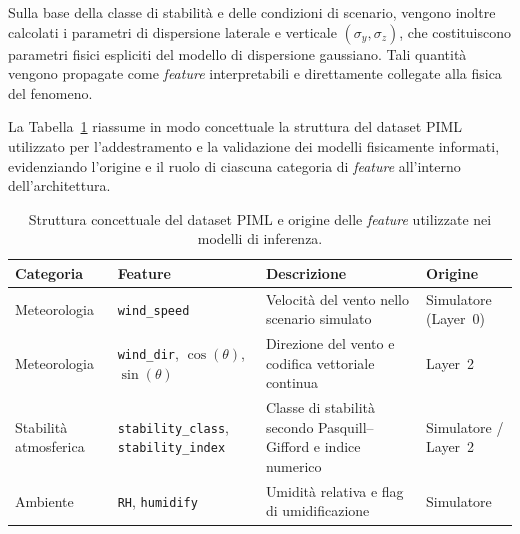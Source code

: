 Sulla base della classe di stabilità e delle condizioni di scenario, vengono inoltre calcolati i parametri di dispersione laterale e verticale $(\sigma_y, \sigma_z)$, che costituiscono parametri fisici espliciti del modello di dispersione gaussiano.
Tali quantità vengono propagate come \textit{feature} interpretabili e direttamente collegate alla fisica del fenomeno.

La Tabella~\ref{tab:piml_dataset_features} riassume in modo concettuale la struttura del dataset PIML utilizzato per l’addestramento e la validazione dei modelli fisicamente informati, evidenziando l’origine e il ruolo di ciascuna categoria di \textit{feature} all’interno dell’architettura.

\begin{table}[H]
	\centering
	\footnotesize
	\setlength{\tabcolsep}{5pt}
	\caption{Struttura concettuale del dataset PIML e origine delle \textit{feature} utilizzate nei modelli di inferenza.}
	\label{tab:piml_dataset_features}
	\begin{tabular}{p{2.4cm} p{3.2cm} p{5.2cm} p{2.4cm}}
		\toprule
		\textbf{Categoria}                                              & \textbf{Feature} & \textbf{Descrizione} & \textbf{Origine} \\
		\midrule
		Meteorologia                                                    &
		\texttt{wind\_speed}                                            &
		Velocità del vento nello scenario simulato                      &
		Simulatore (Layer~0)                                                                                                         \\

		Meteorologia                                                    &
		\texttt{wind\_dir}, $\cos(\theta)$, $\sin(\theta)$              &
		Direzione del vento e codifica vettoriale continua              &
		Layer~2                                                                                                                      \\

		Stabilità atmosferica                                           &
		\texttt{stability\_class}, \texttt{stability\_index}            &
		Classe di stabilità secondo Pasquill--Gifford e indice numerico &
		Simulatore / Layer~2                                                                                                         \\

		Ambiente                                                        &
		\texttt{RH}, \texttt{humidify}                                  &
		Umidità relativa e flag di umidificazione                       &
		Simulatore                                                                                                                   \\


\end{tabular}
\end{table}
